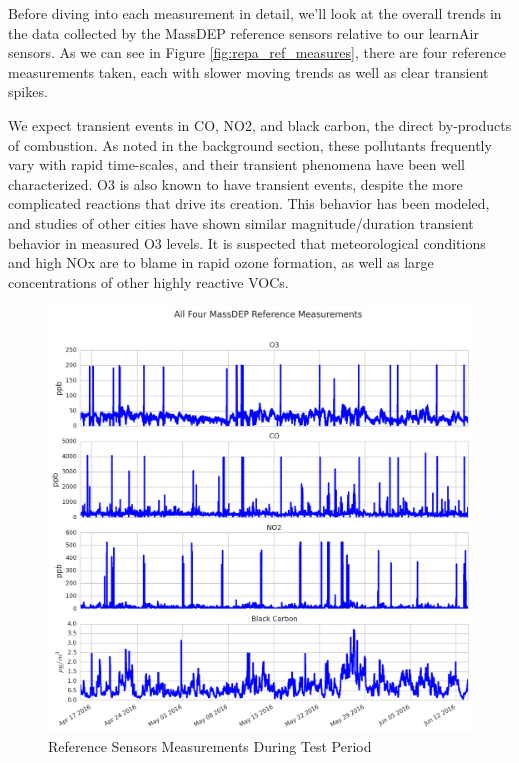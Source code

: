 Before diving into each measurement in detail, we'll look at the overall trends in the data collected by the MassDEP reference sensors relative to our learnAir sensors.  As we can see in Figure \ref{fig:repa_ref_measures}, there are four reference measurements taken, each with slower moving trends as well as clear transient spikes.  

We expect transient events in CO, NO2, and black carbon, the direct by-products of combustion.  As noted in the background section, these pollutants frequently vary with rapid time-scales, and their transient phenomena have been well characterized.  O3 is also known to have transient events, despite the more complicated reactions that drive its creation.  This behavior has been modeled, and studies of other cities have shown similar magnitude/duration transient behavior in measured O3 levels.  It is suspected that meteorological conditions and high NOx are to blame in rapid ozone formation, as well as large concentrations of other highly reactive VOCs. \cite{ozonehouston, houstonvoc, Trevino1999}

\begin{figure}[htb]
 	\includegraphics[width=\textwidth]{figs/epa_ref_measures}               
 	 \caption{Reference Sensors Measurements During Test Period}
  	\label{fig:epa_ref_measures}
\end{figure}

